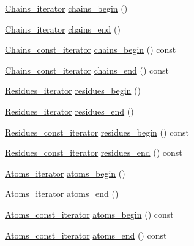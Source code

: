 \begin{DoxyCompactItemize}
\item 
\hyperlink{group__grp__iters_ga763cc293a5df9ae7dd6e31c198dce24b}{Chains\+\_\+iterator} \hyperlink{group__grp__iters_gaab272442c99d33d2f421a632fcee1569}{chains\+\_\+begin} ()
\item 
\hyperlink{group__grp__iters_ga763cc293a5df9ae7dd6e31c198dce24b}{Chains\+\_\+iterator} \hyperlink{group__grp__iters_gac29bcba007d1b8b5d15de7e87ffe3e75}{chains\+\_\+end} ()
\item 
\hyperlink{group__grp__iters_ga32c6b305275f21f3b184688be9d38ffd}{Chains\+\_\+const\+\_\+iterator} \hyperlink{group__grp__iters_ga50ff1b2b5446b4978ff4269732f6ae06}{chains\+\_\+begin} () const
\item 
\hyperlink{group__grp__iters_ga32c6b305275f21f3b184688be9d38ffd}{Chains\+\_\+const\+\_\+iterator} \hyperlink{group__grp__iters_ga9ac120ccf9bf4752172e0013a5bca729}{chains\+\_\+end} () const
\item 
\hyperlink{group__grp__iters_gae3b7c7057b27581b14109723b28a3abd}{Residues\+\_\+iterator} \hyperlink{group__grp__iters_ga8b8a40a8fd62a11dc2dd8c23dec80324}{residues\+\_\+begin} ()
\item 
\hyperlink{group__grp__iters_gae3b7c7057b27581b14109723b28a3abd}{Residues\+\_\+iterator} \hyperlink{group__grp__iters_ga25b33f03211c67afab9abf005d2ceaa1}{residues\+\_\+end} ()
\item 
\hyperlink{group__grp__iters_gab9417777a325c8ca02089328a4468703}{Residues\+\_\+const\+\_\+iterator} \hyperlink{group__grp__iters_ga0a02b98e1bdc627ffcf0ab01f1c82092}{residues\+\_\+begin} () const
\item 
\hyperlink{group__grp__iters_gab9417777a325c8ca02089328a4468703}{Residues\+\_\+const\+\_\+iterator} \hyperlink{group__grp__iters_ga20e41a3080eaa3bd0904651871c2a511}{residues\+\_\+end} () const
\item 
\hyperlink{group__grp__iters_ga458a89ea78f235b807ca0d2dfd9a0427}{Atoms\+\_\+iterator} \hyperlink{group__grp__iters_gac48ce4662bcb0dd1430309447f96422b}{atoms\+\_\+begin} ()
\item 
\hyperlink{group__grp__iters_ga458a89ea78f235b807ca0d2dfd9a0427}{Atoms\+\_\+iterator} \hyperlink{group__grp__iters_ga973ddac842fe62aa21ad96eda78dc155}{atoms\+\_\+end} ()
\item 
\hyperlink{group__grp__iters_ga41096063f109fca33976a17af4b3a1e4}{Atoms\+\_\+const\+\_\+iterator} \hyperlink{group__grp__iters_ga18c69b2f15720e367ae3d766f3bbe704}{atoms\+\_\+begin} () const
\item 
\hyperlink{group__grp__iters_ga41096063f109fca33976a17af4b3a1e4}{Atoms\+\_\+const\+\_\+iterator} \hyperlink{group__grp__iters_ga3c2c120f4056069a1767456fe31de5b5}{atoms\+\_\+end} () const
\end{DoxyCompactItemize}
